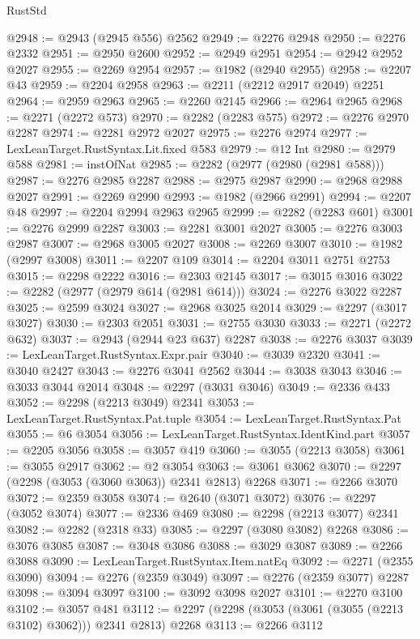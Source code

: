 \begin{lexlean}{RustStd}
\begin{coremodule}
@2948 := @2943 (@2945 @556) @2562
@2949 := @2276 @2948
@2950 := @2276 @2332
@2951 := @2950 @2600
@2952 := @2949 @2951
@2954 := @2942 @2952 @2027
@2955 := @2269 @2954
@2957 := @1982 (@2940 @2955)
@2958 := @2207 @43
@2959 := @2204 @2958
@2963 := @2211 (@2212 @2917 @2049) @2251
@2964 := @2959 @2963
@2965 := @2260 @2145
@2966 := @2964 @2965
@2968 := @2271 (@2272 @573)
@2970 := @2282 (@2283 @575)
@2972 := @2276 @2970 @2287
@2974 := @2281 @2972 @2027
@2975 := @2276 @2974
@2977 := LexLeanTarget.RustSyntax.Lit.fixed @583
@2979 := @12 Int
@2980 := @2979 @588
@2981 := instOfNat
@2985 := @2282 (@2977 (@2980 (@2981 @588)))
@2987 := @2276 @2985 @2287
@2988 := @2975 @2987
@2990 := @2968 @2988 @2027
@2991 := @2269 @2990
@2993 := @1982 (@2966 @2991)
@2994 := @2207 @48
@2997 := @2204 @2994 @2963 @2965
@2999 := @2282 (@2283 @601)
@3001 := @2276 @2999 @2287
@3003 := @2281 @3001 @2027
@3005 := @2276 @3003 @2987
@3007 := @2968 @3005 @2027
@3008 := @2269 @3007
@3010 := @1982 (@2997 @3008)
@3011 := @2207 @109
@3014 := @2204 @3011 @2751 @2753
@3015 := @2298 @2222
@3016 := @2303 @2145
@3017 := @3015 @3016
@3022 := @2282 (@2977 (@2979 @614 (@2981 @614)))
@3024 := @2276 @3022 @2287
@3025 := @2599 @3024
@3027 := @2968 @3025 @2014
@3029 := @2297 (@3017 @3027)
@3030 := @2303 @2051
@3031 := @2755 @3030
@3033 := @2271 (@2272 @632)
@3037 := @2943 (@2944 @23 @637) @2287
@3038 := @2276 @3037
@3039 := LexLeanTarget.RustSyntax.Expr.pair
@3040 := @3039 @2320
@3041 := @3040 @2427
@3043 := @2276 @3041 @2562
@3044 := @3038 @3043
@3046 := @3033 @3044 @2014
@3048 := @2297 (@3031 @3046)
@3049 := @2336 @433
@3052 := @2298 (@2213 @3049) @2341
@3053 := LexLeanTarget.RustSyntax.Pat.tuple
@3054 := LexLeanTarget.RustSyntax.Pat
@3055 := @6 @3054
@3056 := LexLeanTarget.RustSyntax.IdentKind.part
@3057 := @2205 @3056
@3058 := @3057 @419
@3060 := @3055 (@2213 @3058)
@3061 := @3055 @2917
@3062 := @2 @3054
@3063 := @3061 @3062
@3070 := @2297 (@2298 (@3053 (@3060 @3063)) @2341 @2813) @2268
@3071 := @2266 @3070
@3072 := @2359 @3058
@3074 := @2640 (@3071 @3072)
@3076 := @2297 (@3052 @3074)
@3077 := @2336 @469
@3080 := @2298 (@2213 @3077) @2341
@3082 := @2282 (@2318 @33)
@3085 := @2297 (@3080 @3082) @2268
@3086 := @3076 @3085
@3087 := @3048 @3086
@3088 := @3029 @3087
@3089 := @2266 @3088
@3090 := LexLeanTarget.RustSyntax.Item.natEq
@3092 := @2271 (@2355 @3090)
@3094 := @2276 (@2359 @3049)
@3097 := @2276 (@2359 @3077) @2287
@3098 := @3094 @3097
@3100 := @3092 @3098 @2027
@3101 := @2270 @3100
@3102 := @3057 @481
@3112 := @2297 (@2298 (@3053 (@3061 (@3055 (@2213 @3102) @3062))) @2341 @2813) @2268
@3113 := @2266 @3112

\end{coremodule}
\end{lexlean}
